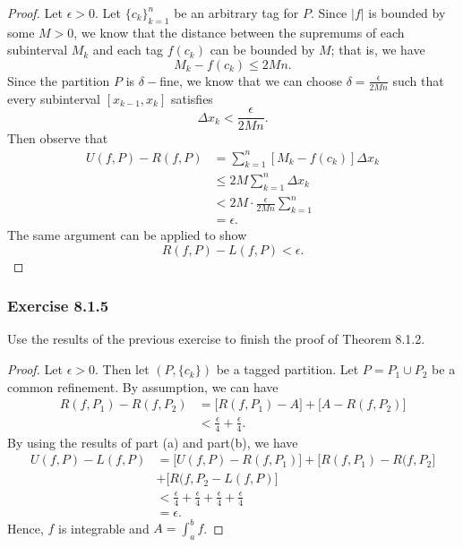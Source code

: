 \begin{enumerate}
        \begin{proof}
            Let \( \epsilon > 0  \). Let \( \{ c_{k } \}_{k=1}^{n}  \) be an arbitrary tag for \( P  \). Since \( | f |  \) is bounded by some \( M > 0  \), we know that the distance between the supremums of each subinterval \( M_{k} \) and each tag \( f(c_{k }) \) can be bounded by \( M  \); that is, we have 
            \[   M_{k } - f(c_{k }) \leq  2Mn. \] Since the partition \( P  \) is \( \delta- \)fine, we know that we can choose \( \delta = \frac{ \epsilon  }{ 2Mn }  \) such that every subinterval \( [x_{k-1}, x_{k}] \) satisfies 
            \[ \Delta x_{k } < \frac{ \epsilon  }{ 2Mn }. \] Then observe that 
        \begin{align*}
            U(f,P) - R(f,P)   &= \sum_{ k=1 }^{ n } [ M_{k } - f(c_{k })]  \Delta x_{k }\\
                              &\leq 2M \sum_{ k=1 }^{n } \Delta x_{k }  \\ 
                              &< 2M \cdot \frac{ \epsilon  }{ 2Mn } \sum_{ k=1 }^{ n } \\
                              &= \epsilon.
        \end{align*}
        The same argument can be applied to show 
        \[  R(f,P) - L(f,P) < \epsilon. \]
        \end{proof}
\end{enumerate}

\subsubsection{Exercise 8.1.5} Use the results of the previous exercise to finish the proof of Theorem 8.1.2.

\begin{proof}
Let \( \epsilon > 0  \). Then let \( (P, \{ c_{k } \}) \) be a tagged partition. Let \( P = P_{1} \cup P_{2} \) be a common refinement. By assumption, we can have 
\begin{align*}
    R(f,P_{1}) - R(f, P_{2}) &= \big[ R(f, P_{1}) - A  \big] + \big[ A - R(f, P_{2})\big]  \\
                             &< \frac{ \epsilon  }{ 4 }  + \frac{ \epsilon  }{ 4 }.
\end{align*} By using the results of part (a) and part(b), we have 
\begin{align*}
    U(f,P) - L(f,P) &= \big[ U(f,P) - R(f,P_{1}) \big]  + \big[ R(f,P_{1}) - R(f,P_{2} \big] \\ 
                    &+ \big[ R(f,P_{2} - L(f,P) \big]  \\
                    &< \frac{ \epsilon  }{ 4 }  + \frac{ \epsilon  }{ 4 }  + \frac{ \epsilon  }{ 4 }  + \frac{ \epsilon  }{ 4  } \\
                    &= \epsilon.
\end{align*}
Hence, \( f  \) is integrable and \( A = \int_{ a }^{ b } f  \).
\end{proof}


